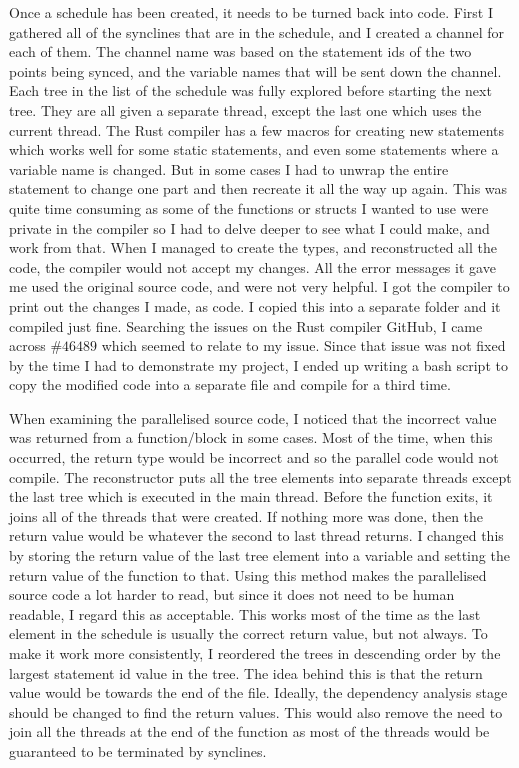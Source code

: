 Once a schedule has been created, it needs to be turned back into code. First I gathered all of the synclines that are in the schedule, and I created a channel for each of them. The channel name was based on the statement ids of the two points being synced, and the variable names that will be sent down the channel. Each tree in the list of the schedule was fully explored before starting the next tree. They are all given a separate thread, except the last one which uses the current thread. The Rust compiler has a few macros for creating new statements which works well for some static statements, and even some statements where a variable name is changed. But in some cases I had to unwrap the entire statement to change one part and then recreate it all the way up again. This was quite time consuming as some of the functions or structs I wanted to use were private in the compiler so I had to delve deeper to see what I could make, and work from that. When I managed to create the types, and reconstructed all the code, the compiler would not accept my changes. All the error messages it gave me used the original source code, and were not very helpful. I got the compiler to print out the changes I made, as code. I copied this into a separate folder and it compiled just fine. Searching the issues on the Rust compiler GitHub, I came across \href{https://github.com/rust-lang/rust/issues/46489}{$\#46489$} which seemed to relate to my issue. Since that issue was not fixed by the time I had to demonstrate my project, I ended up writing a bash script to copy the modified code into a separate file and compile for a third time.

When examining the parallelised source code, I noticed that the incorrect value was returned from a function/block in some cases. Most of the time, when this occurred, the return type would be incorrect and so the parallel code would not compile. The reconstructor puts all the tree elements into separate threads except the last tree which is executed in the main thread. Before the function exits, it joins all of the threads that were created. If nothing more was done, then the return value would be whatever the second to last thread returns. I changed this by storing the return value of the last tree element into a variable and setting the return value of the function to that. Using this method makes the parallelised source code a lot harder to read, but since it does not need to be human readable, I regard this as acceptable. This works most of the time as the last element in the schedule is usually the correct return value, but not always. To make it work more consistently, I reordered the trees in descending order by the largest statement id value in the tree. The idea behind this is that the return value would be towards the end of the file. Ideally, the dependency analysis stage should be changed to find the return values. This would also remove the need to join all the threads at the end of the function as most of the threads would be guaranteed to be terminated by synclines.

